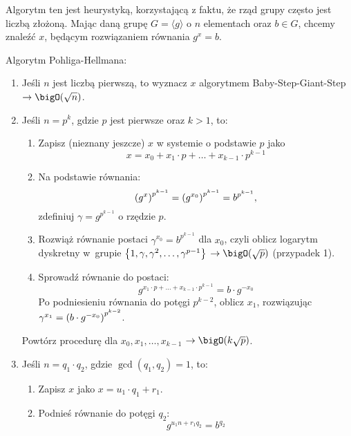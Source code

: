 Algorytm ten jest heurystyką, korzystającą z faktu, że rząd grupy często jest liczbą złożoną. Mając daną grupę \( G = \langle g \rangle \) o \( n \) elementach oraz \( b \in G \), chcemy znaleźć \( x \), będącym rozwiązaniem równania \( g^x = b \).
\begin{greyframe}
    Algorytm Pohliga-Hellmana:
    \begin{enumerate}
        \item Jeśli \( n \) jest liczbą pierwszą, to wyznacz \( x \) algorytmem Baby-Step-Giant-Step \\ \( \rightarrow \bigO(\sqrt{n}) \).
        \item Jeśli \( n = p^k \), gdzie \( p \) jest pierwsze oraz \( k > 1 \), to:
            \begin{enumerate}
                \item Zapisz (nieznany jeszcze) \( x \) w systemie o podstawie \( p \) jako 
                \[
                    x = x_0 + x_1 \cdot p + \ldots + x_{k-1} \cdot p^{k-1}
                \]
                \item Na podstawie równania:
                \[
                    \left(g^x\right)^{p^{k-1}} = \left(g^{x_0}\right)^{p^{k-1}} = b^{p^{k-1}},
                \]
                zdefiniuj \( \gamma = g^{p^{k-1}} \) o rzędzie \( p \).
                \item Rozwiąż równanie postaci \( \gamma^{x_0} = b^{p^{k-1}} \) dla \( x_0 \), czyli oblicz logarytm dyskretny w~grupie \( \set{1, \gamma, \gamma^2, \ldots, \gamma^{p-1}} \) \( \rightarrow \bigO(\sqrt{p}) \) (przypadek 1).
                \item Sprowadź równanie do postaci: 
                \[
                    g^{x_1 \cdot p + \ldots + x_{k-1} \cdot p^{k-1}} = b \cdot g^{-x_0}
                \]
                Po podniesieniu równania do potęgi \( p^{k-2} \), oblicz \( x_1 \), rozwiązując \( \gamma^{x_1} = \left(b \cdot g^{-x_0}\right)^{p^{k-2}} \).
            \end{enumerate}
            Powtórz procedurę dla \( x_0, x_1, \ldots, x_{k-1} \) \( \rightarrow \bigO(k \sqrt{p}) \).
        \item Jeśli \( n  = q_1 \cdot q_2 \), gdzie \( \gcd(q_1, q_2) = 1 \), to:
        \begin{enumerate}
            \item Zapisz \( x \) jako \( x = u_1 \cdot q_1 + r_1 \).
            \item Podnieś równanie do potęgi \( q_2\):
            \[
                g^{u_1n + r_1q_2} = b^{q_2}
\]
\end{enumerate}
\end{enumerate}
\end{greyframe}
